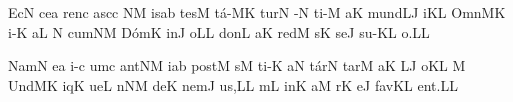 
\smallskip

\initiumgregorianum
{}%
\sgn {}Ec\punctum N\egn
\sgn ce{}\punctum a\egn
\spatium
\sgn ren\punctum c\egn
\sgn {}a{sc}\punctum c\egn
{}\clivis NM\egn
\sgn {}is\punctum a\augmentum b\egn
\spatium
\divisiominima
\spatium
\sgn tes\punctum M\egn
\sgn t{\'a}-\clivis MK\egn
\sgn tur\punctum N\egn
\spatium
{}-\punctum N\egn
\sgn ti-\punctum M\egn
\sgn {}a{}\punctum K\egn
\spatium
\sgn m{u}{nd}\clivis LJ\egn
\sgn {}i{}\punctum K\augmentum L\egn
\spatium
\divisiominor
\spatium
\sgn {}O{mn}\clivis MK\egn
\sgn {}i-\punctum K\egn
\sgn {}a{}\punctum L\egn
\spatium
\custos N
\lineaproxima
\sgn cum\clivis NM\egn
\spatium
\sgn D{\'o}m\punctum K\egn
\sgn {}in\punctum J\egn
\sgn {}o{}\punctum L\augmentum L\egn
\spatium
\divisiominima
\spatium
\sgn d{o}n\punctum L\egn
\sgn {}a{}\punctum K\egn
\spatium
\sgn red\punctum M\egn
\sgn {}{\'\i}s\punctum K\egn
\sgn se{}\punctum J\egn
\spatium
\sgn s{u}-\pes KL\egn
\sgn {}o{.}\punctum L\augmentum L\egn
\Finisgregoriana


\smallskip


\initiumgregorianum
{}%
\sgn Nam\punctum N\egn
{}e{}\punctum a\egn
\spatium
{}i-\punctum c\egn
\sgn {}um\punctum c\egn
{}a{nt}\clivis NM\egn
\sgn {}i{}\punctum a\augmentum b\egn
\spatium
\divisiominima
\spatium
\sgn po{st}\punctum M\egn
\spatium
{}s\punctum M\egn
\sgn ti-\punctum K\egn
\sgn {}a{}\punctum N\egn
\spatium
\sgn t{\'a}r\punctum N\egn
\sgn tar\punctum M\egn
\sgn {}a{}\punctum K\egn
\spatium
{}\clivis LJ\egn
\sgn {}o{}\punctum K\augmentum L\egn
\spatium
\divisiominor
\spatium
\custos M
\lineaproxima
\sgn {}U{nd}\clivis MK\egn
\sgn {}iq\punctum K\egn
\sgn ue{}\punctum L\egn
\spatium
{}n\clivis NM\egn
\sgn de{}\punctum K\egn
\spatium
\sgn n{e}m\punctum J\egn
\sgn {}u{s,}\punctum L\augmentum L\egn
\spatium
\divisiominima
\spatium
{}m\punctum L\egn
\sgn {}in\punctum K\egn
\sgn {}a{}\punctum M\egn
\spatium
{}r\punctum K\egn
\sgn {}e{}\punctum J\egn
\spatium
\sgn f{a}v\pes KL\egn
\sgn {}e{nt.}\punctum L\augmentum L\egn
\Finisgregoriana



